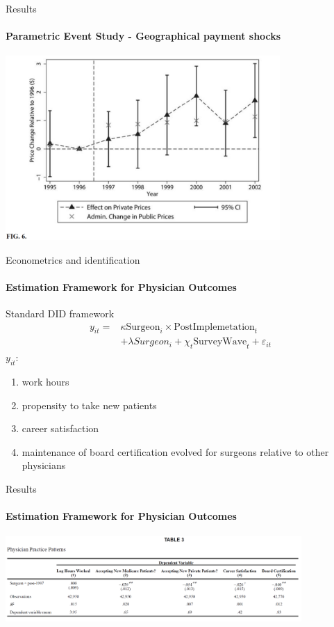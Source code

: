 \documentclass{beamer}
\begin{document}
\begin{frame}{Results}
\framesubtitle{Parametric Event Study - Geographical payment shocks}
\begin{center}
\includegraphics[height=7cm]{fig6}
\end{center}
\end{frame}

\begin{frame}{Econometrics and identification}
\framesubtitle{Estimation Framework for Physician Outcomes}
Standard DID framework
\begin{align*}
y_{it} = & \kappa \text{Surgeon}_i \times \text{PostImplemetation}_t \\
& + \lambda Surgeon_i + \chi_t \text{SurveyWave}_t + \varepsilon_{it}
\end{align*}
$y_{it}$: \\
\begin{enumerate}
\item work hours
\item propensity to take new patients
\item career satisfaction
\item maintenance of board certification evolved for surgeons relative to other physicians
\end{enumerate}
\end{frame}

\begin{frame}{Results}
\framesubtitle{Estimation Framework for Physician Outcomes}
\begin{center}
\includegraphics[height=3.25cm]{tab3}
\end{center}
\end{frame}
\end{document}
